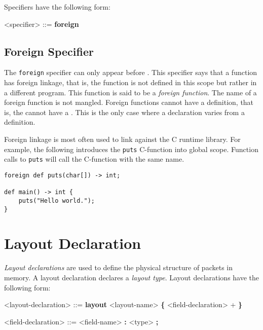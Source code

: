 Specifiers have the following form:

\begin{grammar}
\singlespace
<specifier> ::= \textbf{foreign}
\end{grammar}

\subsection{Foreign Specifier} \label{foreign_spec}

The \texttt{foreign} specifier can only appear before . This specifier says that a function has foreign linkage, that is, the function is not defined in this scope but rather in a different program. This function is said to be a \textit{foreign function}. The name of a foreign function is not mangled. Foreign functions cannot have a definition, that is, the  cannot have a . This is the only case where a declaration varies from a definition.

Foreign linkage is most often used to link against the C runtime library. For example, the following introduces the \texttt{puts} C-function into global scope. Function calls to \texttt{puts} will call the C-function with the same name.

\begin{minip}
\begin{lstlisting}
foreign def puts(char[]) -> int;

def main() -> int {
	puts("Hello world.");
}
\end{lstlisting}
\end{minip}
 
\section{Layout Declaration} \label{layout_guide}

\textit{Layout declarations} are used to define the physical structure of packets in memory. A layout declaration declares a \textit{layout type}. Layout declarations have the following form:

\begin{minip}
\begin{grammar}
<layout-declaration> ::=
\textbf{layout} <layout-name>
\textbf{\{}
	<field-declaration> +
\textbf{\}}

<field-declaration> ::=
<field-name> \textbf{:} <type> \textbf{;}
\end{grammar}
\end{minip}

